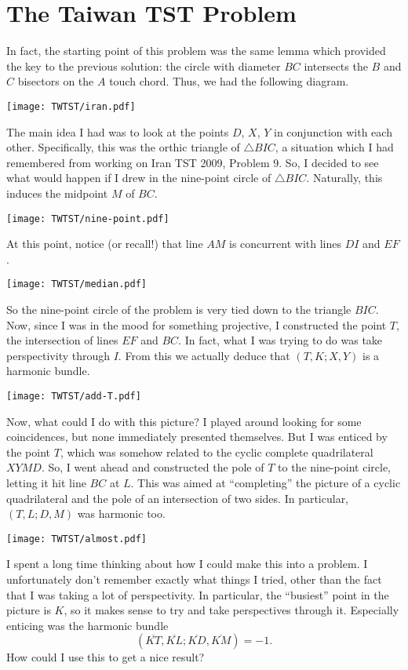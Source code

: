 \documentclass[11pt]{scrartcl}
\begin{document}
\section{The Taiwan TST Problem}
In fact, the starting point of this problem was the same lemma
which provided the key to the previous solution:
the circle with diameter $BC$ intersects the $B$ and $C$ bisectors
on the $A$ touch chord.
Thus, we had the following diagram.
\begin{center}
  \texttt{[image: TWTST/iran.pdf]}
\end{center}
The main idea I had was to look at the points $D$, $X$, $Y$
in conjunction with each other.
Specifically, this was the orthic triangle of $\triangle BIC$,
a situation which I had remembered from working on
Iran TST 2009, Problem 9.
So, I decided to see what would happen
if I drew in the nine-point circle of $\triangle BIC$.
Naturally, this induces the midpoint $M$ of $BC$.
\begin{center}
  \texttt{[image: TWTST/nine-point.pdf]}
\end{center}
At this point, notice (or recall!) that line $AM$
is concurrent with lines $DI$ and $EF$.
\begin{center}
  \texttt{[image: TWTST/median.pdf]}
\end{center}
So the nine-point circle of the problem is very tied
down to the triangle $BIC$.
Now, since I was in the mood for something projective,
I constructed the point $T$,
the intersection of lines $EF$ and $BC$.
In fact, what I was trying to do was take perspectivity through $I$.
From this we actually deduce that $(T,K;X,Y)$ is a harmonic bundle.
\begin{center}
  \texttt{[image: TWTST/add-T.pdf]}
\end{center}

Now, what could I do with this picture?
I played around looking for some coincidences,
but none immediately presented themselves.
But I was enticed by the point $T$, which was somehow
related to the cyclic complete quadrilateral $XYMD$.
So, I went ahead and constructed the pole of $T$
to the nine-point circle, letting it hit line $BC$ at $L$.
This was aimed at ``completing'' the picture
of a cyclic quadrilateral and the pole of an intersection of two sides.
In particular, $(T,L;D,M)$ was harmonic too.
\begin{center}
  \texttt{[image: TWTST/almost.pdf]}
\end{center}
I spent a long time thinking about how I could make this into a problem.
I unfortunately don't remember exactly what things I tried,
other than the fact that I was taking a lot of perspectivity.
In particular, the ``busiest'' point in the picture is $K$,
so it makes sense to try and take perspectives through it.
Especially enticing was the harmonic bundle
\[
  \left( \overline{KT}, \overline{KL}; \overline{KD}, \overline{KM} \right)
  = -1.
\]
How could I use this to get a nice result?
\end{document}
